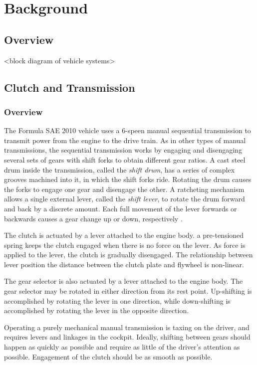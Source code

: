 \chapter{Background}

\section{Overview}

<block diagram of vehicle systems>

\section{Clutch and Transmission}


\subsection{Overview}

The Formula SAE 2010 vehicle uses a 6-speen manual sequential transmission to transmit power from the engine to the drive train. As in other types of manual transmissions, the sequential transmission works by engaging and disengaging several sets of gears with shift forks to obtain different gear ratios. A cast steel drum inside the transmission, called the \emph{shift drum}, has a series of complex grooves machined into it, in which the shift forks ride. Rotating the drum causes the forks to engage one gear and disengage the other. A ratcheting mechanism allows a single external lever, called the \emph{shift lever}, to rotate the drum forward and back by a discrete amount. Each full movement of the lever forwards or backwards causes a gear change up or down, respectively \cite{HowtoManualTransmission, cbr600}.


The clutch is actuated by a lever attached to the engine body. a pre-tensioned spring keeps the clutch engaged when there is no force on the lever. As force is applied to the lever, the clutch is gradually disengaged. The relationship between lever position the distance between the clutch plate and flywheel is non-linear. 

The gear selector is also actuated by a lever attached to the engine body. The gear selector may be rotated in either direction from its rest point. Up-shifting is accomplished by rotating the lever in one direction, while down-shifting is accomplished by rotating the lever in the opposite direction. 

Operating a purely mechanical manual transmission is taxing on the driver, and requires levers and linkages in the cockpit. Ideally, shifting between gears should happen as quickly as possible and require as little of the driver's attention as possible. Engagement of the clutch should be as smooth as possible.

